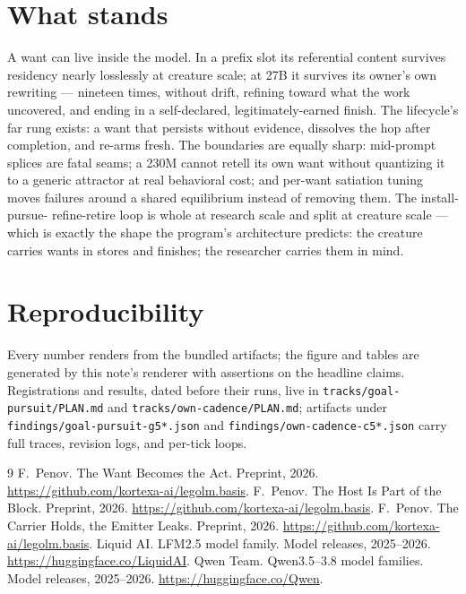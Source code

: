 \documentclass[11pt]{article}
\begin{document}
\section{What stands}

A want can live inside the model. In a prefix slot its referential
content survives residency nearly losslessly at creature scale; at
27B it survives its owner's own rewriting --- nineteen times, without
drift, refining toward what the work uncovered, and ending in a
self-declared, legitimately-earned finish. The lifecycle's far rung
exists: a want that persists without evidence, dissolves the hop
after completion, and re-arms fresh. The boundaries are equally
sharp: mid-prompt splices are fatal seams; a 230M cannot retell its
own want without quantizing it to a generic attractor at real
behavioral cost; and per-want satiation tuning moves failures around
a shared equilibrium instead of removing them. The install-pursue-%
refine-retire loop is whole at research scale and split at creature
scale --- which is exactly the shape the program's architecture
predicts: the creature carries wants in stores and finishes; the
researcher carries them in mind.

\section{Reproducibility}

Every number renders from the bundled artifacts; the figure and
tables are generated by this note's renderer with assertions on the
headline claims. Registrations and results, dated before their runs,
live in \texttt{tracks/goal-pursuit/PLAN.md} and
\texttt{tracks/own-cadence/PLAN.md}; artifacts under
\texttt{findings/goal-pursuit-g5*.json} and
\texttt{findings/own-cadence-c5*.json} carry full traces, revision
logs, and per-tick loops.\par

\begin{thebibliography}{9}
 F.~Penov. The Want Becomes the Act. Preprint,
2026. \url{https://github.com/kortexa-ai/legolm.basis}.
 F.~Penov. The Host Is Part of the Block.
Preprint, 2026. \url{https://github.com/kortexa-ai/legolm.basis}.
 F.~Penov. The Carrier Holds, the Emitter
Leaks. Preprint, 2026.
\url{https://github.com/kortexa-ai/legolm.basis}.
 Liquid AI. LFM2.5 model family. Model releases,
2025--2026. \url{https://huggingface.co/LiquidAI}.
 Qwen Team. Qwen3.5--3.8 model families. Model
releases, 2025--2026. \url{https://huggingface.co/Qwen}.
\end{thebibliography}
\end{document}
